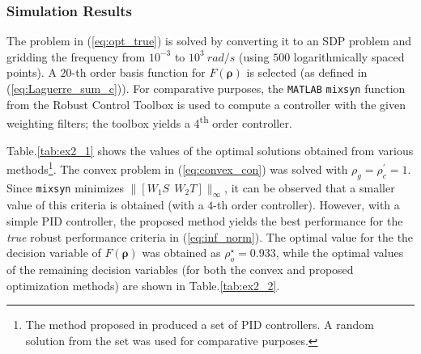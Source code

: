 \documentclass[letterpaper, 10 pt, conference]{ieeeconf}  %
\begin{document}
\subsubsection{Simulation Results}
The problem in (\ref{eq:opt_true}) is solved by converting it to an SDP problem and gridding the frequency from $10^{-3}$ to $10^{3} \ rad/s$ (using $500$ logarithmically spaced points). A $20$-th order basis function for $F(\bm{\rho})$ is selected (as defined in (\ref{eq:Laguerre_sum_c})). For comparative purposes, the \texttt{MATLAB} \texttt{mixsyn} function from the Robust Control Toolbox is used to compute a controller with the given weighting filters; the toolbox yields a 4\textsuperscript{th} order controller. 

Table.\ref{tab:ex2_1} shows the values of the optimal solutions obtained from various methods\footnote{The method proposed in \cite{Zhe10} produced a set of PID controllers. A random solution from the set was used for comparative purposes.}. The convex problem in (\ref{eq:convex_con}) was solved with $\rho_g = \rho_c^{\prime} = 1$. Since \texttt{mixsyn} minimizes $\|[W_1S \ \ W_2T] \|_\infty$, it can be observed that a smaller value of this criteria is obtained (with a $4$-th order controller). However, with a simple PID controller, the proposed method yields the best performance for the \textit{true} robust performance criteria in (\ref{eq:inf_norm}). The optimal value for the the decision variable of $F(\bm{\rho})$ was obtained as $\rho_o^{\star} = 0.933$, while the optimal values of the remaining decision variables (for both the convex and proposed optimization methods) are shown in Table.\ref{tab:ex2_2}. 
\end{document}
